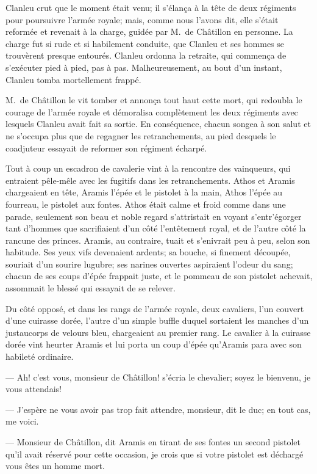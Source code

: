 Clanleu crut que le moment était venu; il s'élança à la tête de deux régiments pour poursuivre l'armée royale; mais, comme nous l'avons dit, elle s'était reformée et revenait à la charge, guidée par M.~de Châtillon en personne. La charge fut si rude et si habilement conduite, que Clanleu et ses hommes se trouvèrent presque entourés. Clanleu ordonna la retraite, qui commença de s'exécuter pied à pied, pas à pas. Malheureusement, au bout d'un instant, Clanleu tomba mortellement frappé.

M.~de Châtillon le vit tomber et annonça tout haut cette mort, qui redoubla le courage de l'armée royale et démoralisa complètement les deux régiments avec lesquels Clanleu avait fait sa sortie. En conséquence, chacun songea à son salut et ne s'occupa plus que de regagner les retranchements, au pied desquels le coadjuteur essayait de reformer son régiment écharpé.

Tout à coup un escadron de cavalerie vint à la rencontre des vainqueurs, qui entraient pêle-mêle avec les fugitifs dans les retranchements. Athos et Aramis chargeaient en tête, Aramis l'épée et le pistolet à la main, Athos l'épée au fourreau, le pistolet aux fontes. Athos était calme et froid comme dans une parade, seulement son beau et noble regard s'attristait en voyant s'entr'égorger tant d'hommes que sacrifiaient d'un côté l'entêtement royal, et de l'autre côté la rancune des princes. Aramis, au contraire, tuait et s'enivrait peu à peu, selon son habitude. Ses yeux vifs devenaient ardents; sa bouche, si finement découpée, souriait d'un sourire lugubre; ses narines ouvertes aspiraient l'odeur du sang; chacun de ses coups d'épée frappait juste, et le pommeau de son pistolet achevait, assommait le blessé qui essayait de se relever.

Du côté opposé, et dans les rangs de l'armée royale, deux cavaliers, l'un couvert d'une cuirasse dorée, l'autre d'un simple buffle duquel sortaient les manches d'un justaucorps de velours bleu, chargeaient au premier rang. Le cavalier à la cuirasse dorée vint heurter Aramis et lui porta un coup d'épée qu'Aramis para avec son habileté ordinaire.

— Ah! c'est vous, monsieur de Châtillon! s'écria le chevalier; soyez le bienvenu, je vous attendais!

— J'espère ne vous avoir pas trop fait attendre, monsieur, dit le duc; en tout cas, me voici.

— Monsieur de Châtillon, dit Aramis en tirant de ses fontes un second pistolet qu'il avait réservé pour cette occasion, je crois que si votre pistolet est déchargé vous êtes un homme mort.

